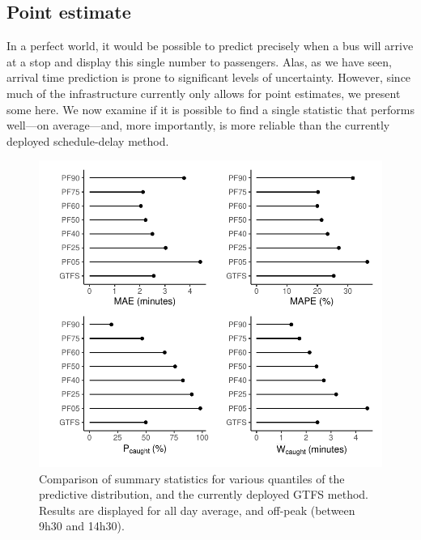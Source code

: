 \subsection{Point estimate}
\label{sec:etas-point}

In a perfect world, it would be possible to predict precisely when a bus will arrive at a stop and display this single number to passengers. Alas, as we have seen, arrival time prediction is prone to significant levels of uncertainty. However, since much of the infrastructure currently only allows for point estimates, we present some here. We now examine if it is possible to find a single statistic that performs well---on average---and, more importantly, is more reliable than the currently deployed schedule-delay method.




\begin{knitrout}\small
{}\color{fgcolor}\begin{figure}

{\centering \includegraphics[width=.7\textwidth]{figure/eta_overall_results-1} 

}

\caption[Comparison of summary statistics for various quantiles of the predictive distribution, and the currently deployed GTFS method]{Comparison of summary statistics for various quantiles of the predictive distribution, and the currently deployed GTFS method. Results are displayed for all day average, and off-peak (between 9h30 and 14h30).}\label{fig:eta_overall_results}
\end{figure}


\end{knitrout}


